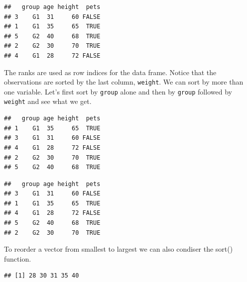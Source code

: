 \documentclass[
]{book}
\newenvironment{Shaded}{\begin{snugshade}}{\end{snugshade}}
\newcommand{\KeywordTok}[1]{\textcolor[rgb]{0.13,0.29,0.53}{\textbf{#1}}}
\newcommand{\NormalTok}[1]{#1}
\newcommand{\OperatorTok}[1]{\textcolor[rgb]{0.81,0.36,0.00}{\textbf{#1}}}
\begin{document}
\begin{verbatim}
##   group age height  pets
## 3    G1  31     60 FALSE
## 1    G1  35     65  TRUE
## 5    G2  40     68  TRUE
## 2    G2  30     70  TRUE
## 4    G1  28     72 FALSE
\end{verbatim}

The ranks are used as row indices for the data frame. Notice that the observations are sorted by the last column, \texttt{weight}. We can sort by more than one variable. Let's first sort by \texttt{group} alone and then by \texttt{group} followed by \texttt{weight} and see what we get.

\begin{Shaded}
\end{Shaded}

\begin{verbatim}
##   group age height  pets
## 1    G1  35     65  TRUE
## 3    G1  31     60 FALSE
## 4    G1  28     72 FALSE
## 2    G2  30     70  TRUE
## 5    G2  40     68  TRUE
\end{verbatim}

\begin{Shaded}
\end{Shaded}

\begin{verbatim}
##   group age height  pets
## 3    G1  31     60 FALSE
## 1    G1  35     65  TRUE
## 4    G1  28     72 FALSE
## 5    G2  40     68  TRUE
## 2    G2  30     70  TRUE
\end{verbatim}

To reorder a vector from smallest to largest we can also condiser the sort() function.

\begin{Shaded}
\end{Shaded}

\begin{verbatim}
## [1] 28 30 31 35 40
\end{verbatim}
\end{document}
